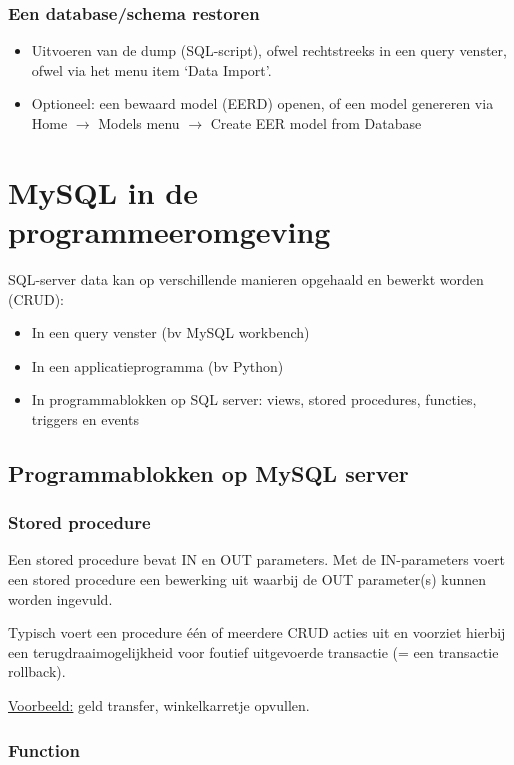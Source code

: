 \documentclass{article}
\begin{document}
\subsubsection{Een database/schema restoren}
\begin{itemize}
    \item Uitvoeren van de dump (SQL-script), ofwel rechtstreeks in een query venster, ofwel via het menu item `Data Import'.
    \item Optioneel: een bewaard model (EERD) openen, of een model genereren via Home $\rightarrow$ Models menu $\rightarrow$ Create EER model from Database
\end{itemize}


\section{MySQL in de programmeeromgeving}

SQL-server data kan op verschillende manieren opgehaald en bewerkt worden (CRUD):
\begin{itemize}
    \item In een query venster (bv MySQL workbench)
    \item In een applicatieprogramma (bv Python)
    \item In programmablokken op SQL server: views, stored procedures, functies, triggers en events
\end{itemize}

\subsection{Programmablokken op MySQL server}

\subsubsection{Stored procedure}
Een stored procedure bevat IN en OUT parameters. Met de IN-parameters voert een stored
procedure een bewerking uit waarbij de OUT parameter(s) kunnen worden ingevuld. 

Typisch voert een procedure één of meerdere CRUD acties uit en voorziet hierbij een terugdraaimogelijkheid
voor foutief uitgevoerde transactie (= een transactie rollback).

\underline{Voorbeeld:} geld transfer, winkelkarretje opvullen.
\subsubsection{Function}
\end{document}
